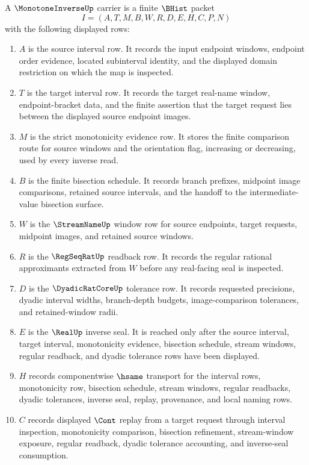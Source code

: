 \begin{definition}
\label{def:monotone-inverse-carrier}
A $\MonotoneInverseUp$ carrier is a finite $\BHist$ packet
$$
I=(A,T,M,B,W,R,D,E,H,C,P,N)
$$
with the following displayed rows:
\begin{enumerate}
\item $A$ is the source interval row. It records the input endpoint windows, endpoint order evidence, located subinterval identity, and the displayed domain restriction on which the map is inspected.
\item $T$ is the target interval row. It records the target real-name window, endpoint-bracket data, and the finite assertion that the target request lies between the displayed source endpoint images.
\item $M$ is the strict monotonicity evidence row. It stores the finite comparison route for source windows and the orientation flag, increasing or decreasing, used by every inverse read.
\item $B$ is the finite bisection schedule. It records branch prefixes, midpoint image comparisons, retained source intervals, and the handoff to the intermediate-value bisection surface.
\item $W$ is the $\StreamNameUp$ window row for source endpoints, target requests, midpoint images, and retained source windows.
\item $R$ is the $\RegSeqRatUp$ readback row. It records the regular rational approximants extracted from $W$ before any real-facing seal is inspected.
\item $D$ is the $\DyadicRatCoreUp$ tolerance row. It records requested precisions, dyadic interval widths, branch-depth budgets, image-comparison tolerances, and retained-window radii.
\item $E$ is the $\RealUp$ inverse seal. It is reached only after the source interval, target interval, monotonicity evidence, bisection schedule, stream windows, regular readback, and dyadic tolerance rows have been displayed.
\item $H$ records componentwise $\hsame$ transport for the interval rows, monotonicity row, bisection schedule, stream windows, regular readbacks, dyadic tolerances, inverse seal, replay, provenance, and local naming rows.
\item $C$ records displayed $\Cont$ replay from a target request through interval inspection, monotonicity comparison, bisection refinement, stream-window exposure, regular readback, dyadic tolerance accounting, and inverse-seal consumption.

\end{enumerate}
\end{definition}

